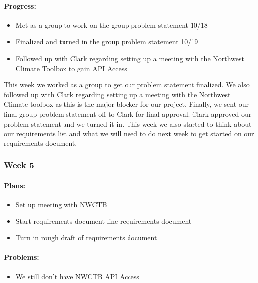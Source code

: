 \documentclass[onecolumn, draftclsnofoot,10pt, compsoc]{article}
\begin{document}
		    \paragraph{Progress:} \hfill \break
		    
		        \begin{itemize}
		            \item Met as a group to work on the group problem statement 10/18
		            \item Finalized and turned in the group problem statement 10/19
		            \item Followed up with Clark regarding setting up a meeting with the Northwest Climate Toolbox to gain API Access
		        \end{itemize}
		        
		            This week we worked as a group to get our problem statement finalized. We also followed up with Clark regarding setting up a meeting with the Northwest Climate toolbox as this is the major blocker for our project. Finally, we sent our final group problem statement off to Clark for final approval. Clark approved our problem statement and we turned it in. This week we also started to think about our requirements list and what we will need to do next week to get started on our requirements document.\\
		    
		\subsubsection{Week 5}
			\paragraph{Plans:} \hfill \break
		        
		        \begin{itemize}
		            \item Set up meeting with NWCTB
		            \item Start requirements document
		            \out line requirements document
		            \item Turn in rough draft of requirements document
		        \end{itemize}
		        
		    \paragraph{Problems:} \hfill \break
		        \begin{itemize}
		            \item We still don't have NWCTB API Access
		        \end{itemize}
		
\end{document}

